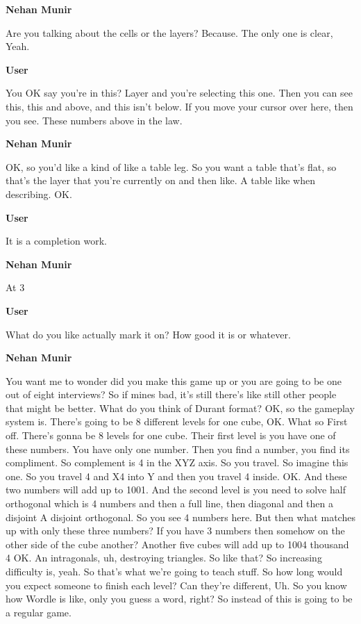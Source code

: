 \documentclass{article}
\begin{document}
\noindent \textbf{Nehan Munir}

Are you talking about the cells or the layers? Because. The only one is clear, Yeah.

\noindent \textbf{User}

You OK say you're in this? Layer and you're selecting this one. Then you can see this, this and above, and this isn't below. If you move your cursor over here, then you see. These numbers above in the law.

\noindent \textbf{Nehan Munir}

OK, so you'd like a kind of like a table leg. So you want a table that's flat, so that's the layer that you're currently on and then like. A table like when describing. OK.

\noindent \textbf{User}

It is a completion work.

\noindent \textbf{Nehan Munir}

At 3%

\noindent \textbf{User}

What do you like actually mark it on? How good it is or whatever.

\noindent \textbf{Nehan Munir}

You want me to wonder did you make this game up or you are going to be one out of eight interviews? So if mines bad, it's still there's like still other people that might be better. What do you think of Durant format? OK, so the gameplay system is. There's going to be 8 different levels for one cube, OK. What so First off. There's gonna be 8 levels for one cube. Their first level is you have one of these numbers. You have only one number. Then you find a number, you find its compliment. So complement is 4 in the XYZ axis. So you travel. So imagine this one. So you travel 4 and X4 into Y and then you travel 4 inside. OK. And these two numbers will add up to 1001. And the second level is you need to solve half orthogonal which is 4 numbers and then a full line, then diagonal and then a disjoint A disjoint orthogonal. So you see 4 numbers here. But then what matches up with only these three numbers? If you have 3 numbers then somehow on the other side of the cube another? Another five cubes will add up to 1004 thousand 4 OK. An intragonals, uh, destroying triangles. So like that? So increasing difficulty is, yeah. So that's what we're going to teach stuff. So how long would you expect someone to finish each level? Can they're different, Uh. So you know how Wordle is like, only you guess a word, right? So instead of this is going to be a regular game.
\end{document}
